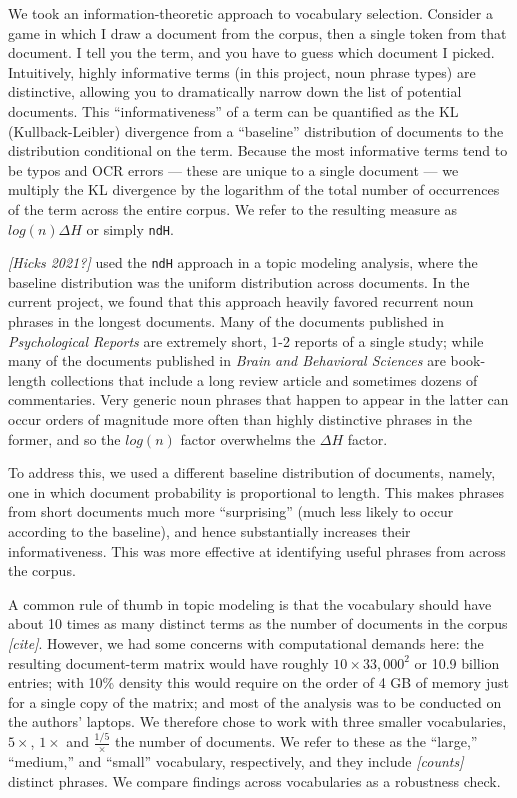 \documentclass[12pt]{article}
\begin{document}
We took an information-theoretic approach to vocabulary selection. Consider a game in which I draw a document from the corpus, then a single token from that document. I tell you the term, and you have to guess which document I picked. Intuitively, highly informative terms (in this project, noun phrase types) are distinctive, allowing you to dramatically narrow down the list of potential documents. This ``informativeness'' of a term can be quantified as the KL (Kullback-Leibler) divergence from a ``baseline'' distribution of documents to the distribution conditional on the term. Because the most informative terms tend to be typos and OCR errors --- these are unique to a single document --- we multiply the KL divergence by the logarithm of the total number of occurrences of the term across the entire corpus. We refer to the resulting measure as \(log(n) \Delta H\) or simply \texttt{ndH}.

\emph{{[}Hicks 2021?{]}} used the \texttt{ndH} approach in a topic modeling analysis, where the baseline distribution was the uniform distribution across documents. In the current project, we found that this approach heavily favored recurrent noun phrases in the longest documents. Many of the documents published in \emph{Psychological Reports} are extremely short, 1-2 reports of a single study; while many of the documents published in \emph{Brain and Behavioral Sciences} are book-length collections that include a long review article and sometimes dozens of commentaries. Very generic noun phrases that happen to appear in the latter can occur orders of magnitude more often than highly distinctive phrases in the former, and so the \(log(n)\) factor overwhelms the \(\Delta H\) factor.

To address this, we used a different baseline distribution of documents, namely, one in which document probability is proportional to length. This makes phrases from short documents much more ``surprising'' (much less likely to occur according to the baseline), and hence substantially increases their informativeness. This was more effective at identifying useful phrases from across the corpus.

A common rule of thumb in topic modeling is that the vocabulary should have about 10 times as many distinct terms as the number of documents in the corpus \emph{{[}cite{]}}. However, we had some concerns with computational demands here: the resulting document-term matrix would have roughly \(10 \times 33,000^2\) or 10.9 billion entries; with 10\% density this would require on the order of 4 GB of memory just for a single copy of the matrix; and most of the analysis was to be conducted on the authors' laptops. We therefore chose to work with three smaller vocabularies, \(5 \times\), \(1 \times\) and \(\frac{1/5} \times\) the number of documents. We refer to these as the ``large,'' ``medium,'' and ``small'' vocabulary, respectively, and they include \emph{{[}counts{]}} distinct phrases. We compare findings across vocabularies as a robustness check.
\end{document}
